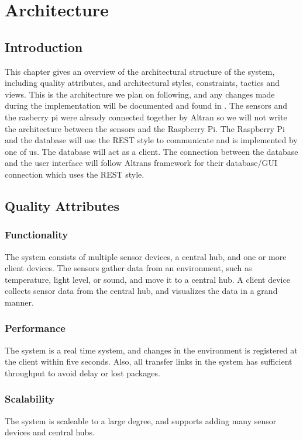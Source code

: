 \documentclass[../document.tex]{subfiles}
\begin{document}
\section{Architecture}
\label{architecture}
\subsection{Introduction}
This chapter gives an overview of the architectural structure of the system, including quality attributes, and architectural styles, constraints, tactics and views. This is the architecture we plan on following, and any changes made during the implementation will be documented and found in . The sensors and the rasberry pi were already connected together by Altran so we will not write the architecture between the sensors and the Raspberry Pi. The Raspberry Pi and the database will use the REST style to communicate and is implemented by one of us. The database will act as a client. The connection between the database and the user interface will follow Altrans framework for their database/GUI connection which uses the REST style.

\subsection{Quality Attributes}
\subsubsection{Functionality}
The system consists of multiple sensor devices, a central hub, and one or more client devices. The sensors gather data from an environment, such as temperature, light level, or sound, and move it to a central hub. A client device collects sensor data from the central hub, and visualizes the data in a grand manner.

\subsubsection{Performance}
The system is a real time system, and changes in the environment is registered at the client within five seconds. Also, all transfer links in the system has sufficient throughput to avoid delay or lost packages.

\subsubsection{Scalability}
The system is scaleable to a large degree, and supports adding many sensor devices and central hubs.
\end{document}
